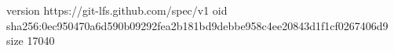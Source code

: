 version https://git-lfs.github.com/spec/v1
oid sha256:0ec950470a6d590b09292fea2b181bd9debbe958c4ee20843d1f1cf0267406d9
size 17040
